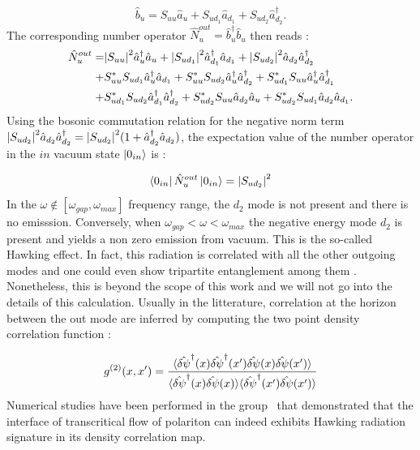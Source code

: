 \begin{equation}
    \hat{b}_u = S_{uu}\hat{a}_u + S_{ud_1}\hat{a}_{d_1} + S_{ud_2}\hat{a}_{d_2}^\dagger.
\end{equation}
The corresponding number operator $\hat{N}_u^{out}=\hat{b}_u^\dagger\hat{b}_u$ then reads :
\begin{equation}
    \begin{aligned}
        \hat{N}_u^{out} = &\abs{S_{uu}}^2\hat{a}_u^\dagger\hat{a}_u + \abs{S_{ud_1}}^2\hat{a}_{d_1}^\dagger\hat{a}_{d_1} + \abs{S_{ud_2}}^2\hat{a}_{d_2}\hat{a}_{d_2}^\dagger \\ 
        + & S_{uu}^*S_{ud_1}\hat{a}_u^\dagger\hat{a}_{d_1}+ S_{uu}^*S_{ud_2}\hat{a}_u^\dagger\hat{a}_{d_2}^\dagger + S_{ud_1}^*S_{uu}\hat{a}_u^\dagger\hat{a}_{d_1}^\dagger  \\
        + & S_{ud_1}^*S_{ud_2}\hat{a}_{d_1}^\dagger\hat{a}_{d_2}^\dagger+ S_{ud_2}^*S_{uu}\hat{a}_{d_2}\hat{a}_u+ S_{ud_2}^*S_{ud_1}\hat{a}_{d_2}\hat{a}_{d_1}. 
    \end{aligned}
\end{equation}
Using the bosonic commutation relation for the negative norm term $\abs{S_{ud_2}}^2\hat{a}_{d_2}\hat{a}_{d_2}^\dagger=\abs{S_{ud_2}}^2(1+\hat{a}_{d_2}^\dagger\hat{a}_{d_2})$, the expectation
value of the number operator in the $in$ vacuum state $\ket{0_{in}}$ is :

\begin{equation}
    \bra{0_{in}}\hat{N}_u^{out}\ket{0_{in}} = \abs{S_{ud_2}}^2 
\end{equation}
In the $\omega \notin [\omega_{gap}, \omega_{max}]$ frequency range, the $d_2$ mode is not present and there is no emisssion. Conversely, when $\omega_{gap}<\omega<\omega_{max}$ 
the negative energy mode $d_2$ is present and yields a non zero emission from vacuum. This is the so-called Hawking effect. In fact,
 this radiation is correlated with all the other outgoing modes and one could even show tripartite entanglement among them \cite{isoard_quantum_2019}. Nonetheless, this is beyond the
 scope of this work and we will not go into the details of this calculation. Usually in the litterature, correlation at the horizon 
 between the out mode are inferred by computing the two point density correlation function \cite{Recati_acousticHR_2009, nguyen_acoustic_2015} :

 \begin{equation}
    g^{(2)}(x,x')=\dfrac{\langle{\hat{\delta\psi}}^\dagger(x)\hat{\delta\psi}^\dagger(x')\hat{\delta\psi}(x)\hat{\delta\psi}(x')\rangle}{\langle \hat{\delta\psi}^\dagger(x)\hat{\delta\psi}(x)\rangle\langle \hat{\delta\psi}^\dagger(x')\hat{\delta\psi}(x')\rangle}
 \end{equation}
 Numerical studies have been performed in the group~\cite{jacquet_quantum_2023} that demonstrated that the interface of transcritical flow of polariton can indeed exhibits Hawking radiation signature in its density correlation map.


